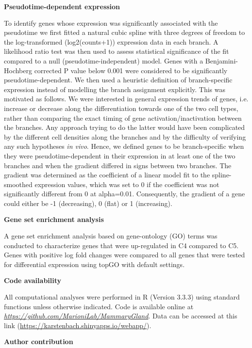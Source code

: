 \documentclass[titlepage, 12pt, oneside]{amsart}
\begin{document}
\textbf{Pseudotime-dependent expression}

To identify genes whose expression was significantly associated with the pseudotime we first fitted a natural cubic spline with three degrees of freedom to the log-transformed (log2(counts+1)) expression data in each branch.
A likelihood ratio test was then used to assess statistical significance of the fit compared to a null (pseudotime-independent) model.
Genes with a Benjamini-Hochberg corrected P value below 0.001 were considered to be significantly pseudotime-dependent.
We then used a heuristic definition of branch-specific expression instead of modelling the branch assignment explicitly.
This was motivated as follows. We were interested in general expression trends of genes, i.e. increase or decrease along the differentiation towards one of the two cell types, rather than comparing the exact timing of gene activation/inactivation between the branches.
Any approach trying to do the latter would have been complicated by the different cell densities along the branches and by the difficulty of verifying any such hypotheses \textit{in vivo}.
Hence, we defined genes to be branch-specific when they were pseudotime-dependent in their expression in at least one of the two branches and when the gradient differed in signs between two branches.
The gradient was determined as the coefficient of a linear model fit to the spline-smoothed expression values, which was set to 0 if the coefficient was not significantly different from 0 at alpha=0.01.
Consequently, the gradient of a gene could either be -1 (decreasing), 0 (flat) or 1 (increasing).

\textbf{Gene set enrichment analysis}

A gene set enrichment analysis based on gene-ontology (GO) terms was conducted to characterize genes that were up-regulated in C4 compared to C5.
Genes with positive log fold changes were compared to all genes that were tested for differential expression using topGO with default settings\autocite{Alexa2016}.

\textbf{Code availability}

All computational analyses were performed in R (Version 3.3.3) using standard functions unless otherwise indicated.
Code is available online at \href{https://github.com/MarioniLab/MammaryGland}{\textit{https://github.com/MarioniLab/MammaryGland}}.
Data can be accessed at this link (\url{https://karstenbach.shinyapps.io/webapp/}).

\textbf{Author contribution}
\end{document}
